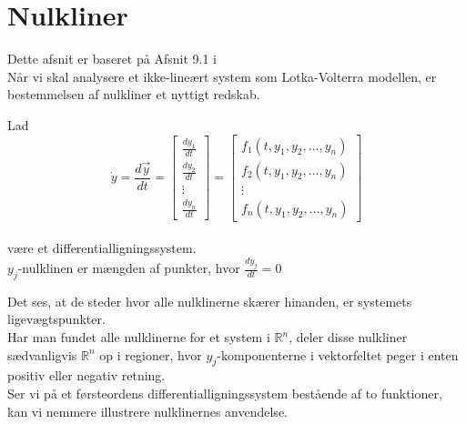 \section{Nulkliner}
Dette afsnit er baseret på Afsnit 9.1 i \citep{Hirsch} \\
Når vi skal analysere et ikke-lineært system som Lotka-Volterra modellen, er bestemmelsen af nulkliner et nyttigt redskab.

\begin{definition}[Nulkliner]
Lad 
\\
$$\dot{y} = \frac{d\vec{y}}{dt} = 
\begin{bmatrix}
\frac{dy_1}{dt} \\
\frac{dy_2}{dt}\\
\vdots \\
\frac{dy_n}{dt}
\end{bmatrix}
=
\begin{bmatrix}
f_1(t, y_1, y_2, \hdots, y_n)\\
f_2(t, y_1, y_2, \hdots, y_n)\\
\vdots \\
f_n(t, y_1, y_2, \hdots, y_n)
\end{bmatrix}$$
\\
være et differentialligningssystem. \\
$y_j$-nulklinen er mængden af punkter, hvor $\frac{dy_j}{dt}=0$ 
\end{definition}
Det ses, at de steder hvor alle nulklinerne skærer hinanden, er systemets ligevægtspunkter. \\
Har man fundet alle nulklinerne for et system i $\mathbb{R}^n$, deler disse nulkliner sædvanligvis $\mathbb{R}^n$ op i regioner, hvor $y_j$-komponenterne i vektorfeltet peger i enten positiv eller negativ retning. \\
Ser vi på et førsteordens differentialligningssystem bestående af to funktioner, kan vi nemmere illustrere nulklinernes anvendelse.
